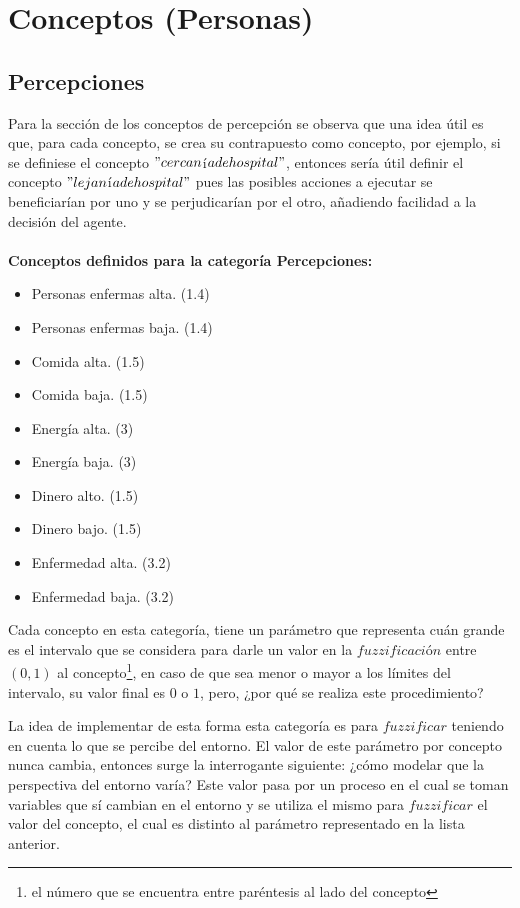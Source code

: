 \section{Conceptos (Personas)}
\subsection{Percepciones}
Para la sección de los conceptos de percepción se observa que una idea útil es que, para cada concepto, se crea su contrapuesto
como concepto, por ejemplo, si se definiese el concepto $"cercan$í$a de hospital"$, entonces sería útil definir el concepto
$"lejan$í$a de hospital"$ pues las posibles acciones a ejecutar se beneficiarían por uno y se perjudicarían por el otro,
añadiendo facilidad a la decisión del agente.\\
\\
\textbf{Conceptos definidos para la categoría Percepciones:}
\begin{itemize}
    \item Personas enfermas alta. (1.4)
    \item Personas enfermas baja. (1.4)
    \item Comida alta. (1.5)
    \item Comida baja. (1.5)
    \item Energía alta. (3)
    \item Energía baja. (3)
    \item Dinero alto. (1.5)
    \item Dinero bajo. (1.5)
    \item Enfermedad alta. (3.2)
    \item Enfermedad baja. (3.2)
\end{itemize}

Cada concepto en esta categoría, tiene un parámetro que representa cuán grande es el intervalo que se considera para darle un valor en la 
$fuzzificaci$ó$n$ entre $(0,1)$ al concepto\footnote{el número que se encuentra entre paréntesis al lado del concepto}, en caso 
de que sea menor o mayor a los límites del intervalo, su valor final es $0$ o $1$, pero, ¿por qué
se realiza este procedimiento?

La idea de implementar de esta forma esta categoría es para $fuzzificar$ teniendo en cuenta lo que se percibe 
del entorno. El valor de este parámetro por concepto nunca cambia, entonces surge la interrogante siguiente: 
¿cómo modelar que la perspectiva del entorno varía? Este valor pasa por un proceso en el cual se toman variables que sí
cambian en el entorno y se utiliza el mismo para $fuzzificar$ el valor del concepto, el cual es distinto al parámetro 
representado en la lista anterior.

